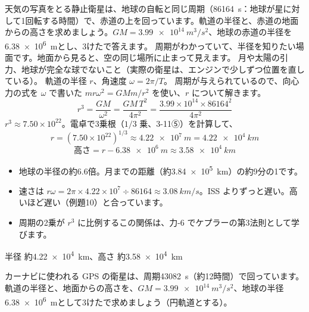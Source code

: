 \begin{phreidai}[静止衛星の高さ]
\label{ph:力-2:ex11}天気の写真をとる静止衛星は、地球の自転と同じ周期（\qty{86164}{s}：地球が星に対して1回転する時間）で、赤道の上を回っています。軌道の半径と、赤道の地面からの高さを求めましょう。$GM=\allowbreak\qty{3.99e14}{m^3/s^2}$、地球の赤道の半径を\qty{6.38e6}{m}とし、3けたで答えます。
\phbamen
周期がわかっていて、半径を知りたい場面です。地面から見ると、空の同じ場所に止まって見えます。
\phmushi
月や太陽の引力、地球が完全な球でないこと（実際の衛星は、エンジンで少しずつ位置を直している）。
\phzu
軌道の半径 $r$、角速度 $\omega=2\pi/T$。
\phriyu
周期が与えられているので、向心力の式を $\omega$ で書いた $mr\omega^2=GMm/r^2$ を使い、$r$ について解きます。
\phtateru
\[ r^3=\frac{GM}{\omega^2}=\frac{GM\,T^2}{4\pi^2}=\frac{3.99\times10^{14}\times\num{86164}^2}{4\pi^2} \]
\phtoku
$r^3\approx7.50\times10^{22}$。電卓で3乗根（$1/3$ 乗、3-11⑤）を計算して、
\[ r=(7.50\times10^{22})^{1/3}\approx\qty{4.22e7}{m}=\qty{4.22e4}{km} \]
\[ \text{高さ}=r-\qty{6.38e6}{m}\approx\qty{3.58e4}{km} \]
\phtashikame
\begin{itemize}[leftmargin=1.2\zw, itemsep=1pt, topsep=1pt, label={\color{bkTheme}●}]
\item 地球の半径の約6.6倍。月までの距離（約\qty{3.84e5}{km}）の約9分の1です。
\item 速さは $r\omega=2\pi\times4.22\times10^7\div\num{86164}\approx\qty{3.08}{km/s}$。ISS よりずっと遅い。高いほど遅い（例題10）と合っています。
\item 周期の2乗が $r^3$ に比例するこの関係は、力-6 でケプラーの第3法則として学びます。
\end{itemize}
\kotae 半径 約\qty{4.22e4}{km}、高さ 約\qty{3.58e4}{km}
\end{phreidai}
\begin{jibun}
カーナビに使われる GPS の衛星は、周期\qty{43082}{s}（約12時間）で回っています。軌道の半径と、地面からの高さを、$GM=\allowbreak\qty{3.99e14}{m^3/s^2}$、地球の半径\qty{6.38e6}{m}として3けたで求めましょう（円軌道とする）。
\end{jibun}

